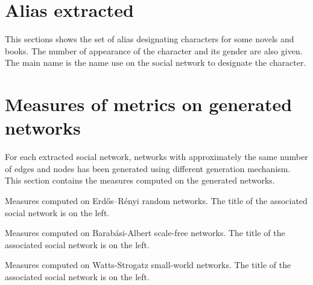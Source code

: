 \documentclass[a4paper, 12pt]{report}
\begin{document}
\begin{appendices}
\chapter{Alias extracted}
This sections shows the set of alias designating characters for some novels and books.
The number of appearance of the character and its gender are also given. 
The main name is the name use on the social network to designate the character.
\label{alias_extracted}



\chapter{Measures of metrics on generated networks}
\label{measures_generated}
For each extracted social network, networks with approximately the same number of edges and nodes has been generated using different generation mechanism. This section contains the measures computed on the generated networks.


\begin{table}[]
         \caption{Measures computed on Erdős–Rényi random networks. The title of the associated social network is on the left.}
\end{table}


\begin{table}[]
         \caption{Measures computed on Barabási-Albert scale-free networks. The title of the associated social network is on the left.}
\end{table}


\begin{table}[]
         \caption{Measures computed on Watts-Strogatz small-world networks. The title of the associated social network is on the left.}
\end{table}

\end{appendices} 
\end{document}
